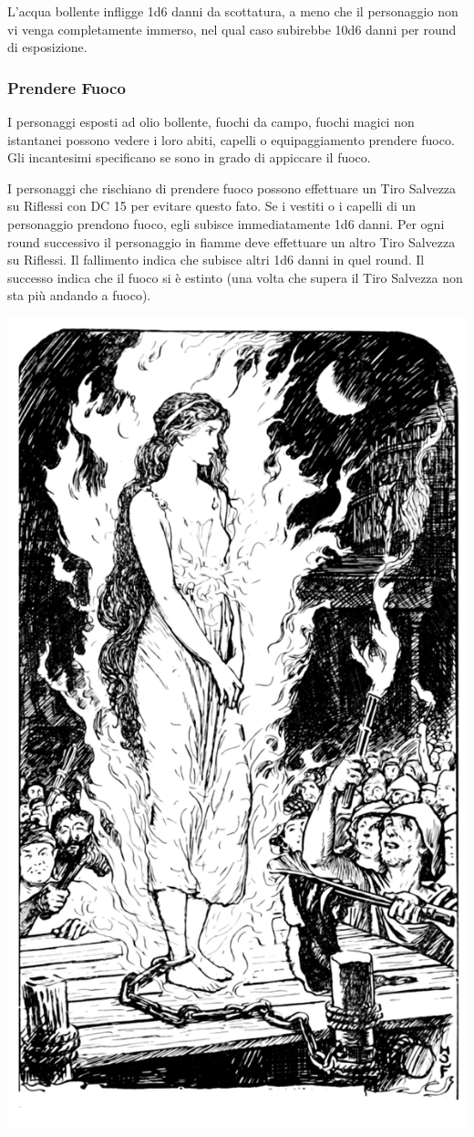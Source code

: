 \begin{multicols}{2}
L'acqua bollente infligge 1d6 danni da scottatura, a meno che il personaggio non vi venga completamente immerso, nel qual caso subirebbe 10d6 danni per round di esposizione.

\subsubsection{Prendere Fuoco}

\label{prendere-fuoco}

I personaggi esposti ad olio bollente, fuochi da campo, fuochi magici non istantanei possono vedere i loro abiti, capelli o equipaggiamento prendere fuoco. Gli incantesimi specificano se sono in grado di appiccare il fuoco.

I personaggi che rischiano di prendere fuoco possono effettuare un Tiro Salvezza su Riflessi con DC 15 per evitare questo fato. Se i vestiti o i capelli di un personaggio prendono fuoco, egli subisce immediatamente 1d6 danni. Per ogni round successivo il personaggio in fiamme deve effettuare un altro Tiro Salvezza su Riflessi. Il fallimento indica che subisce altri 1d6 danni in quel round. Il successo indica che il fuoco si è estinto (una volta che supera il Tiro Salvezza non sta più andando a fuoco).


\begin{center}
	\includegraphics[width=0.7\linewidth]{immagini/fuocopericolo.png}
\end{center}



\end{multicols}
